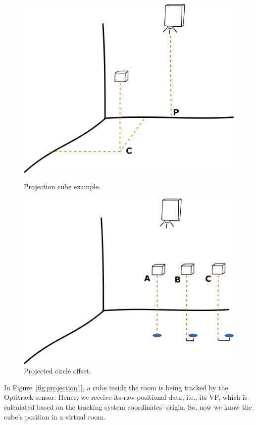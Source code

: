 \begin{figure}[!t]
  \centering
  \includegraphics[width=\linewidth]{imgs/impl/projection1}
    \caption{Projection cube example.}
    \label{fig:projection1}
    \endminipage\hfill
{}
  \centering
  \includegraphics[width=\linewidth]{imgs/impl/projection2}
    \caption{Projected circle offset.}
    \label{fig:projection2}
    \endminipage
\end{figure}



In Figure~\ref{fig:projection1}, a cube inside the room is being tracked by the Optitrack sensor. Hence, we receive its raw positional data, i.e., its \ac{VP}, which is calculated based on the tracking system coordinates' origin.
So, now we know the cube's position in a virtual room. 

